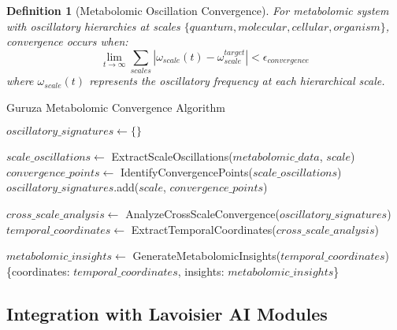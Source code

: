 \documentclass[12pt,a4paper]{article}
\newtheorem{definition}{Definition}
\begin{document}
\begin{definition}[Metabolomic Oscillation Convergence]
For metabolomic system with oscillatory hierarchies at scales $\{quantum, molecular, cellular, organism\}$, convergence occurs when:
\begin{equation}
\lim_{t \to \infty} \sum_{scales} |\omega_{scale}(t) - \omega_{scale}^{target}| < \epsilon_{convergence}
\end{equation}
where $\omega_{scale}(t)$ represents the oscillatory frequency at each hierarchical scale.
\end{definition}

\begin{algorithm}
\caption{Guruza Metabolomic Convergence Algorithm}
\begin{algorithmic}
    \State $oscillatory\_signatures \gets \{\}$
    
        \State $scale\_oscillations \gets$ ExtractScaleOscillations($metabolomic\_data$, $scale$)
        \State $convergence\_points \gets$ IdentifyConvergencePoints($scale\_oscillations$)
        \State $oscillatory\_signatures$.add($scale$, $convergence\_points$)
    \EndFor
    
    \State $cross\_scale\_analysis \gets$ AnalyzeCrossScaleConvergence($oscillatory\_signatures$)
    \State $temporal\_coordinates \gets$ ExtractTemporalCoordinates($cross\_scale\_analysis$)
    
    \State $metabolomic\_insights \gets$ GenerateMetabolomicInsights($temporal\_coordinates$)
    \State \Return \{coordinates: $temporal\_coordinates$, insights: $metabolomic\_insights$\}
\EndProcedure
\end{algorithmic}
\end{algorithm}

\subsection{Integration with Lavoisier AI Modules}
\end{document}
